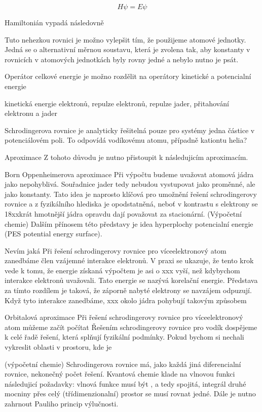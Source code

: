 \documentclass[
  color, %
  table, %
  lof,   %
  lot,   %
]{fithesis3}
\begin{document}
\[H \psi = E \psi\]

Hamiltonián vypadá následovně

Tuto nehezkou rovnici je možno vylepšit tím, že použijeme atomové jednotky. Jedná se o alternativní měrnou soustavu, která je zvolena tak, aby konstanty v rovnicích v atomových jednotkách byly rovny jedné a nebylo nutno je psát.

Operátor celkové energie je možno rozdělit na operátory kinetické a potencialní energie

kinetická energie elektronů, repulze elektronů, repulze jader, přitahování elektronu a jader

Schrodingerova rovnice je analyticky řešitelná pouze pro systémy jedna částice v potenciálovém poli. To odpovídá vodíkovému atomu, případně kationtu helia?

Aproximace
Z tohoto důvodu je nutno přistoupit k následujicím aproximacím.

Born Oppenheimerova aproximace
Při výpočtu budeme uvažovat atomová jádra jako nepohyblivá. Souřadnice jader tedy nebudou vystupovat jako proměnné, ale jako konstanty. Tato idea je naprosto klíčová pro umožnění řešení schrodingerovy rovnice a z fyzikálního hlediska je opodstatněná, neboť  v kontrastu s elektrony se 18xxkrát hmotnější jádra opravdu dají považovat za stacionární. (Výpočetní chemie) Dalším přínosem této představy je idea hyperplochy potencialní energie (PES potential energy surface).

Nevím jaká
Při řešení schrodingerovy rovnice pro víceelektronový atom zanedbáme člen vzájemné interakce elektronů. V praxi se ukazuje, že tento krok vede k tomu, že energie získaná výpočtem je asi o xxx vyší, než kdybychom interakce elektronů uvažovali. Tato energie se nazývá korelační energie. Představa za tímto rozdílem je taková, že záporně nabyté elektrony se navzájem odpuzují. Když tyto interakce zanedbáme, xxx okolo jádra pohybují takovým způsobem


Orbitalová aproximace
Při řešení schrodingerovy rovnice pro víceelektronový atom můžeme začít počítat 
Řešením schrodingerovy rovnice pro vodík dospějeme k celé řadě řešení, která splňují fyzikální podmínky. Pokud bychom si nechali vykreslit oblasti v prostoru, kde je  

(výpočetní chemie) Schrodingerova rovnice má, jako každá jiná diferencialní rovnice, nekonečný počet řešení. Kvantová chemie klade na vlnovou funkci následujicí požadavky: vlnová funkce musí být , a tedy spojitá, integrál druhé mocniny přes celý (třídimenzionalní) prostor se musí rovnat jedné. Dále je nutno zahrnout Pauliho princip výlučnosti.
\end{document}
